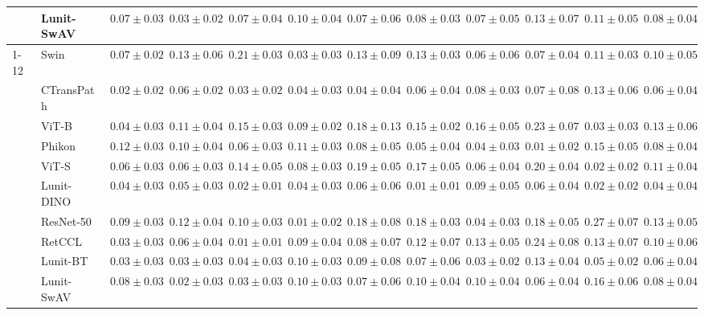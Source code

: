 \begin{tabular}{ll|cccc|c|cccc|c}
 & Lunit-SwAV & $0.07 \pm 0.03$ & $0.03 \pm 0.02$ & $0.07 \pm 0.04$ & $0.10 \pm 0.04$ & $0.07 \pm 0.06$ & $0.08 \pm 0.03$ & $0.07 \pm 0.05$ & $0.13 \pm 0.07$ & $0.11 \pm 0.05$ & $0.08 \pm 0.04$ \\
\cline{1-12}
\multirow[t]{10}{*}{Transformer} & Swin & $0.07 \pm 0.02$ & $0.13 \pm 0.06$ & $0.21 \pm 0.03$ & $0.03 \pm 0.03$ & $0.13 \pm 0.09$ & $0.13 \pm 0.03$ & $0.06 \pm 0.06$ & $0.07 \pm 0.04$ & $0.11 \pm 0.03$ & $0.10 \pm 0.05$ \\
 & CTransPath & $\mathbf{0.02 \pm 0.02}$ & $0.06 \pm 0.02$ & $0.03 \pm 0.02$ & $0.04 \pm 0.03$ & $\mathbf{0.04 \pm 0.04}$ & $0.06 \pm 0.04$ & $0.08 \pm 0.03$ & $0.07 \pm 0.08$ & $0.13 \pm 0.06$ & $0.06 \pm 0.04$ \\
 & ViT-B & $0.04 \pm 0.03$ & $0.11 \pm 0.04$ & $0.15 \pm 0.03$ & $0.09 \pm 0.02$ & $0.18 \pm 0.13$ & $0.15 \pm 0.02$ & $0.16 \pm 0.05$ & $0.23 \pm 0.07$ & $0.03 \pm 0.03$ & $0.13 \pm 0.06$ \\
 & Phikon & $0.12 \pm 0.03$ & $0.10 \pm 0.04$ & $0.06 \pm 0.03$ & $0.11 \pm 0.03$ & $0.08 \pm 0.05$ & $0.05 \pm 0.04$ & $0.04 \pm 0.03$ & $\mathbf{0.01 \pm 0.02}$ & $0.15 \pm 0.05$ & $0.08 \pm 0.04$ \\
 & ViT-S & $0.06 \pm 0.03$ & $0.06 \pm 0.03$ & $0.14 \pm 0.05$ & $0.08 \pm 0.03$ & $0.19 \pm 0.05$ & $0.17 \pm 0.05$ & $0.06 \pm 0.04$ & $0.20 \pm 0.04$ & $\mathbf{0.02 \pm 0.02}$ & $0.11 \pm 0.04$ \\
 & Lunit-DINO & $0.04 \pm 0.03$ & $0.05 \pm 0.03$ & $0.02 \pm 0.01$ & $0.04 \pm 0.03$ & $0.06 \pm 0.06$ & $\mathbf{0.01 \pm 0.01}$ & $0.09 \pm 0.05$ & $0.06 \pm 0.04$ & $0.02 \pm 0.02$ & $\mathbf{0.04 \pm 0.04}$ \\
 & ResNet-50 & $0.09 \pm 0.03$ & $0.12 \pm 0.04$ & $0.10 \pm 0.03$ & $\mathbf{0.01 \pm 0.02}$ & $0.18 \pm 0.08$ & $0.18 \pm 0.03$ & $0.04 \pm 0.03$ & $0.18 \pm 0.05$ & $0.27 \pm 0.07$ & $0.13 \pm 0.05$ \\
 & RetCCL & $0.03 \pm 0.03$ & $0.06 \pm 0.04$ & $\mathbf{0.01 \pm 0.01}$ & $0.09 \pm 0.04$ & $0.08 \pm 0.07$ & $0.12 \pm 0.07$ & $0.13 \pm 0.05$ & $0.24 \pm 0.08$ & $0.13 \pm 0.07$ & $0.10 \pm 0.06$ \\
 & Lunit-BT & $0.03 \pm 0.03$ & $0.03 \pm 0.03$ & $0.04 \pm 0.03$ & $0.10 \pm 0.03$ & $0.09 \pm 0.08$ & $0.07 \pm 0.06$ & $\mathbf{0.03 \pm 0.02}$ & $0.13 \pm 0.04$ & $0.05 \pm 0.02$ & $0.06 \pm 0.04$ \\
 & Lunit-SwAV & $0.08 \pm 0.03$ & $\mathbf{0.02 \pm 0.03}$ & $0.03 \pm 0.03$ & $0.10 \pm 0.03$ & $0.07 \pm 0.06$ & $0.10 \pm 0.04$ & $0.10 \pm 0.04$ & $0.06 \pm 0.04$ & $0.16 \pm 0.06$ & $0.08 \pm 0.04$ \\

\end{tabular}
